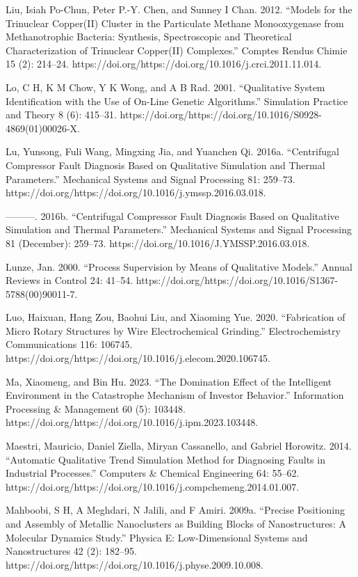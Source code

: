 \documentclass[utf8]{gradu3}
\begin{document}
Liu, Isiah Po-Chun, Peter P.-Y. Chen, and Sunney I Chan. 2012. “Models for the Trinuclear Copper(II) Cluster in the Particulate Methane Monooxygenase from Methanotrophic Bacteria: Synthesis, Spectroscopic and Theoretical Characterization of Trinuclear Copper(II) Complexes.” Comptes Rendus Chimie 15 (2): 214–24. https://doi.org/https://doi.org/10.1016/j.crci.2011.11.014.

Lo, C H, K M Chow, Y K Wong, and A B Rad. 2001. “Qualitative System Identification with the Use of On-Line Genetic Algorithms.” Simulation Practice and Theory 8 (6): 415–31. https://doi.org/https://doi.org/10.1016/S0928-4869(01)00026-X.

Lu, Yunsong, Fuli Wang, Mingxing Jia, and Yuanchen Qi. 2016a. “Centrifugal Compressor Fault Diagnosis Based on Qualitative Simulation and Thermal Parameters.” Mechanical Systems and Signal Processing 81: 259–73. https://doi.org/https://doi.org/10.1016/j.ymssp.2016.03.018.

———. 2016b. “Centrifugal Compressor Fault Diagnosis Based on Qualitative Simulation and Thermal Parameters.” Mechanical Systems and Signal Processing 81 (December): 259–73. https://doi.org/10.1016/J.YMSSP.2016.03.018.

Lunze, Jan. 2000. “Process Supervision by Means of Qualitative Models.” Annual Reviews in Control 24: 41–54. https://doi.org/https://doi.org/10.1016/S1367-5788(00)90011-7.

Luo, Haixuan, Hang Zou, Baohui Liu, and Xiaoming Yue. 2020. “Fabrication of Micro Rotary Structures by Wire Electrochemical Grinding.” Electrochemistry Communications 116: 106745. https://doi.org/https://doi.org/10.1016/j.elecom.2020.106745.

Ma, Xiaomeng, and Bin Hu. 2023. “The Domination Effect of the Intelligent Environment in the Catastrophe Mechanism of Investor Behavior.” Information Processing \& Management 60 (5): 103448. https://doi.org/https://doi.org/10.1016/j.ipm.2023.103448.

Maestri, Mauricio, Daniel Ziella, Miryan Cassanello, and Gabriel Horowitz. 2014. “Automatic Qualitative Trend Simulation Method for Diagnosing Faults in Industrial Processes.” Computers \& Chemical Engineering 64: 55–62. https://doi.org/https://doi.org/10.1016/j.compchemeng.2014.01.007.

Mahboobi, S H, A Meghdari, N Jalili, and F Amiri. 2009a. “Precise Positioning and Assembly of Metallic Nanoclusters as Building Blocks of Nanostructures: A Molecular Dynamics Study.” Physica E: Low-Dimensional Systems and Nanostructures 42 (2): 182–95. https://doi.org/https://doi.org/10.1016/j.physe.2009.10.008.
\end{document}

